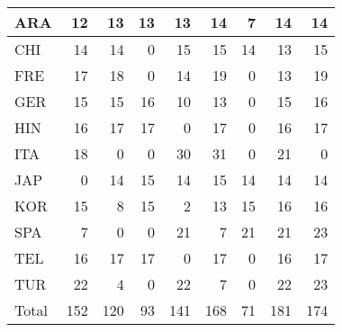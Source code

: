 \documentclass[11pt,letterpaper]{article}
\begin{document}
\begin{table*}[!ht]
\begin{small}
\begin{center}
{\begin{tabular}{lrrrrrrrr}
            ARA     &   12 & 13 & 13 & 13 & 14 & 7  & 14 & 14  \\ \hline
            CHI    &   14 & 14 & 0  & 15 & 15 & 14 & 13 & 15  \\ \hline
            FRE     &   17 & 18 & 0  & 14 & 19 & 0  & 13 & 19  \\ \hline
            GER     &   15 & 15 & 16 & 10 & 13 & 0  & 15 & 16  \\ \hline
            HIN      &   16 & 17 & 17 & 0  & 17 & 0  & 16 & 17  \\ \hline
            ITA    &   18 & 0  & 0  & 30 & 31 & 0  & 21 & 0   \\ \hline
            JAP   &   0  & 14 & 15 & 14 & 15 & 14 & 14 & 14  \\ \hline
            KOR     &   15 & 8  & 15 & 2  & 13 & 15 & 16 & 16  \\ \hline
            SPA    &   7  & 0  & 0  & 21 & 7  & 21 & 21 & 23  \\ \hline
            TEL     &   16 & 17 & 17 & 0  & 17 & 0  & 16 & 17  \\ \hline
            TUR    &   22 & 4  & 0  & 22 & 7  & 0  & 22 & 23  \\ \hline \hline
            Total      &   152& 120& 93 & 141& 168& 71 & 181& 174 \\ \hline
        \end{tabular}
}
~\\~\\
\end{center}
\end{small}
\end{table*}
\end{document}
